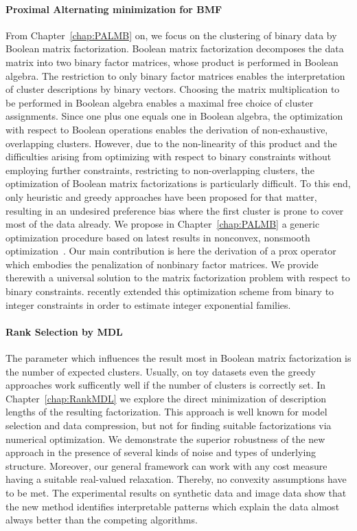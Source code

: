 \paragraph{Proximal Alternating minimization for BMF} From Chapter~\ref{chap:PALMB} on, we focus on the clustering of binary data by Boolean matrix factorization. Boolean matrix factorization decomposes the data matrix into two binary factor matrices, whose product is performed in Boolean algebra. The restriction to only binary factor matrices enables the interpretation of cluster descriptions by binary vectors. Choosing the matrix multiplication to be performed in Boolean algebra enables a maximal free choice of cluster assignments. Since one plus one equals one in Boolean algebra, the optimization with respect to Boolean operations enables the derivation of non-exhaustive, overlapping clusters. However, due to the non-linearity of this product and the difficulties arising from optimizing with respect to binary constraints without employing further constraints, restricting to non-overlapping clusters, the optimization of Boolean matrix factorizations is particularly difficult. To this end, only heuristic and greedy approaches have been proposed for that matter, resulting in an undesired preference bias where the first cluster is prone to cover most of the data already. We propose in Chapter~\ref{chap:PALMB} a generic optimization procedure based on latest results in nonconvex, nonsmooth optimization~\cite{hess2017primping}. Our main contribution is here the derivation of a prox operator which embodies the penalization of nonbinary factor matrices. We provide therewith a universal solution to the matrix factorization problem with respect to binary constraints. \cite{piatkowski2018exponential} recently  extended this optimization scheme from binary to integer constraints in order to estimate integer exponential families. 
\paragraph{Rank Selection by MDL} 
The parameter which influences the result most in Boolean matrix factorization is the number of expected clusters. Usually, on toy datasets even the greedy approaches work sufficently well if the number of clusters is correctly set. In Chapter~\ref{chap:RankMDL} we explore the direct minimization of description lengths of the resulting factorization. This approach is well known for model selection and data compression, but not for finding suitable factorizations via numerical optimization. 
We demonstrate the superior robustness of the new approach in the presence of several kinds of noise and types of underlying structure. 
Moreover, our general framework can work with any cost measure having a suitable real-valued relaxation. Thereby, no convexity assumptions have to be met. 
The experimental results on synthetic data and image data show that the new method identifies interpretable patterns 
which explain the data almost always better than the competing algorithms. 
